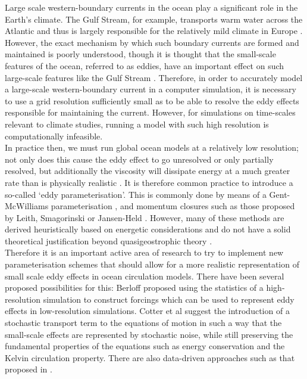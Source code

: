 Large scale western-boundary currents in the ocean play a significant role in the Earth's climate. The Gulf Stream, for example, transports warm water across the Atlantic and thus is largely responsible for the relatively mild climate in Europe \cite{rossby_1996}. However, the exact mechanism by which such boundary currents are formed and maintained is poorly understood, though it is thought that the small-scale features of the ocean, referred to as eddies, have an important effect on such large-scale features like the Gulf Stream \cite{berloff_2015}. Therefore, in order to accurately model a large-scale western-boundary current in a computer simulation, it is necessary to use a grid resolution sufficiently small as to be able to resolve the eddy effects responsible for maintaining the current. However, for simulations on time-scales relevant to climate studies, running a model with such high resolution is computationally infeasible. \\
\indnt In practice then, we must run global ocean models at a relatively low resolution; not only does this cause the eddy effect to go unresolved or only partially resolved, but additionally the viscosity will dissipate energy at a much greater rate than is physically realistic \cite{juricke_danilov_kutsenko_oliver_2019}. It is therefore common practice to introduce a so-called `eddy parameterisation'. This is commonly done by means of a Gent-McWilliams parameterisation \cite{gent_mcwilliams_1990}, and momentum closures such as those proposed by Leith, Smagorinski \cite{fox-kemper_menemenlis_2008} or Jansen-Held \cite{jansen_held_2014}. However, many of these methods are derived heuristically based on energetic considerations and do not have a solid theoretical justification beyond quasigeostrophic theory \cite{danilov_juricke_kutsenko_oliver_2019}. \\
\indnt  Therefore it is an important active area of research to try to implement new parameterisation schemes that should allow for a more realistic representation of small scale eddy effects in ocean circulation models. There have been several proposed possibilities for this: Berloff \cite{berloff_2015,berloff_2016,berloff_2018} proposed using the statistics of a high-resolution simulation to construct forcings which can be used to represent eddy effects in low-resolution simulations. Cotter et al \cite{cotter_crisan_holm_pan_shevchenko_2018} suggest the introduction of a stochastic transport term to the equations of motion in such a way that the small-scale effects are represented by stochastic noise, while still preserving the fundamental properties of the equations such as energy conservation and the Kelvin circulation property.  There are also data-driven approaches such as that proposed in \cite{kondrashov_chekroun_berloff_2018}. \\
